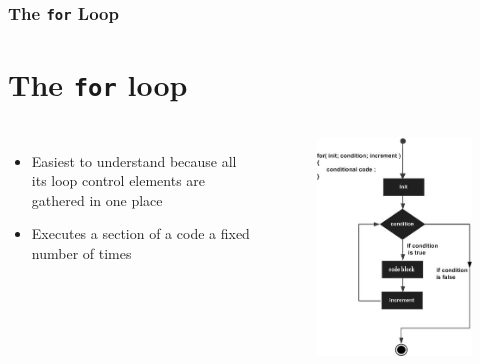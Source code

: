 \documentclass{beamer}
\begin{document}
\begin{frame}
    \frametitle{The \texttt{for} Loop}
    \section{The \texttt{for} loop} %
    \label{sec:the_texttt_for}
    \begin{columns}
        \begin{itemize}
            \item Easiest to understand because all its loop control elements are gathered in one place
            \item Executes a section of a code a fixed number of times
        \end{itemize}
        \begin{figure}
            \centering
            \includegraphics[scale=0.4]{for}
        \end{figure}
    \end{columns}
\end{frame}
\end{document}
